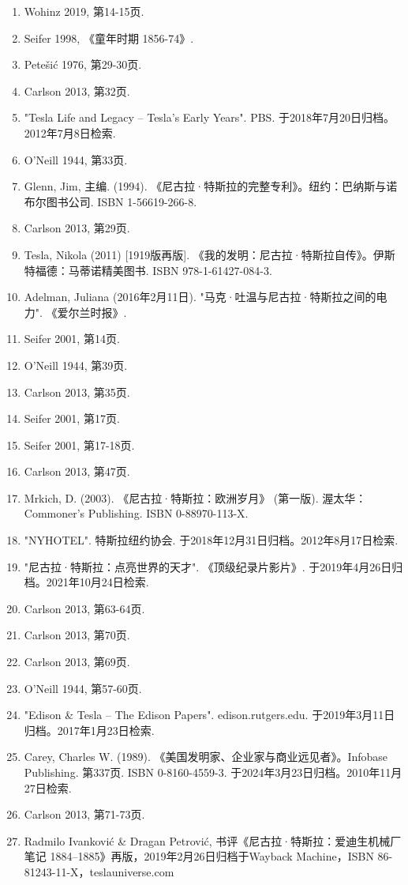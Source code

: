\begin{enumerate}
\item Wohinz 2019, 第14-15页.  
\item Seifer 1998, 《童年时期 1856-74》.  
\item Petešić 1976, 第29-30页.  
\item Carlson 2013, 第32页.  
\item "Tesla Life and Legacy – Tesla's Early Years". PBS. 于2018年7月20日归档。2012年7月8日检索.  
\item O'Neill 1944, 第33页.  
\item Glenn, Jim, 主编. (1994). 《尼古拉·特斯拉的完整专利》。纽约：巴纳斯与诺布尔图书公司. ISBN 1-56619-266-8.  
\item Carlson 2013, 第29页.  
\item Tesla, Nikola (2011) [1919版再版]. 《我的发明：尼古拉·特斯拉自传》。伊斯特福德：马蒂诺精美图书. ISBN 978-1-61427-084-3.  
\item Adelman, Juliana (2016年2月11日). "马克·吐温与尼古拉·特斯拉之间的电力". 《爱尔兰时报》.  
\item Seifer 2001, 第14页.  
\item O'Neill 1944, 第39页.  
\item Carlson 2013, 第35页.  
\item Seifer 2001, 第17页.  
\item Seifer 2001, 第17-18页.  
\item Carlson 2013, 第47页.  
\item Mrkich, D. (2003). 《尼古拉·特斯拉：欧洲岁月》 (第一版). 渥太华：Commoner's Publishing. ISBN 0-88970-113-X.  
\item "NYHOTEL". 特斯拉纽约协会. 于2018年12月31日归档。2012年8月17日检索.  
\item "尼古拉·特斯拉：点亮世界的天才". 《顶级纪录片影片》. 于2019年4月26日归档。2021年10月24日检索.  
\item Carlson 2013, 第63-64页.  
\item Carlson 2013, 第70页.  
\item Carlson 2013, 第69页.  
\item O'Neill 1944, 第57-60页.  
\item "Edison & Tesla – The Edison Papers". edison.rutgers.edu. 于2019年3月11日归档。2017年1月23日检索.  
\item Carey, Charles W. (1989). 《美国发明家、企业家与商业远见者》。Infobase Publishing. 第337页. ISBN 0-8160-4559-3. 于2024年3月23日归档。2010年11月27日检索.  
\item Carlson 2013, 第71-73页.  
\item Radmilo Ivanković & Dragan Petrović, 书评《尼古拉·特斯拉：爱迪生机械厂笔记 1884–1885》再版，2019年2月26日归档于Wayback Machine，ISBN 86-81243-11-X，teslauniverse.com  

\end{enumerate}
